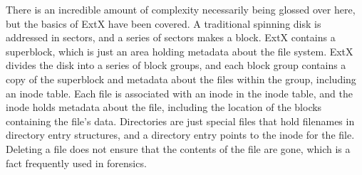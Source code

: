 There is an incredible amount of complexity necessarily being glossed over here, but the basics of ExtX have been covered.
A traditional spinning disk is addressed in sectors, and a series of sectors makes a block. ExtX contains a superblock,
which is just an area holding metadata about the file system. ExtX divides the disk into a series of block groups, and each
block group contains a copy of the superblock and metadata about the files within the group, including an inode table. Each file is
associated with an inode in the inode table, and the inode holds metadata about the file, including the location of the blocks
containing the file's data. Directories are just special files that hold filenames in directory entry structures, and a directory entry
points to the inode for the file. Deleting a file does not ensure that the contents of the file are gone, which is a fact frequently
used in forensics.

